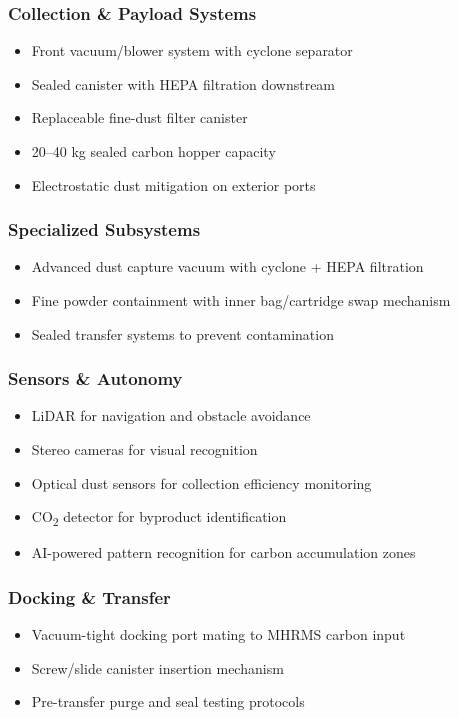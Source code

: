 \documentclass[12pt, a4paper]{article}
\begin{document}
\subsubsection{Collection \& Payload Systems}
\begin{itemize}
    \item Front vacuum/blower system with cyclone separator
    \item Sealed canister with HEPA filtration downstream
    \item Replaceable fine-dust filter canister
    \item 20–40 kg sealed carbon hopper capacity
    \item Electrostatic dust mitigation on exterior ports
\end{itemize}

\subsubsection{Specialized Subsystems}
\begin{itemize}
    \item Advanced dust capture vacuum with cyclone + HEPA filtration
    \item Fine powder containment with inner bag/cartridge swap mechanism
    \item Sealed transfer systems to prevent contamination
\end{itemize}

\subsubsection{Sensors \& Autonomy}
\begin{itemize}
    \item LiDAR for navigation and obstacle avoidance
    \item Stereo cameras for visual recognition
    \item Optical dust sensors for collection efficiency monitoring
    \item CO\textsubscript{2} detector for byproduct identification
    \item AI-powered pattern recognition for carbon accumulation zones
\end{itemize}

\subsubsection{Docking \& Transfer}
\begin{itemize}
    \item Vacuum-tight docking port mating to MHRMS carbon input
    \item Screw/slide canister insertion mechanism
    \item Pre-transfer purge and seal testing protocols
\end{itemize}
\end{document}

